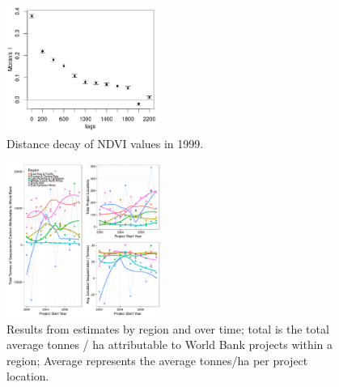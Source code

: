 \documentclass[sustainability,article,submit,moreauthors,pdftex,10pt,a4paper]{mdpi}
\begin{document}
\begin{figure}[H]
\centering
 \includegraphics[width=0.45\textwidth]{pre_avg_NDVI_max_full.png}
\caption{Distance decay of NDVI values in 1999.}
\label{DDFig}
\end{figure}

\begin{figure}[H]
\centering
 \includegraphics[width=0.45\textwidth]{result_disag.png}
\caption{Results from estimates by region and over time; total is the total average tonnes / ha attributable to World Bank projects within a region; Average represents the average tonnes/ha per project location.}
\label{result_fig}
\vspace{10pt}
\end{figure}  
\end{document}
